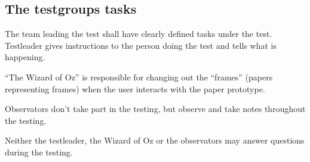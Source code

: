 \subsection{The testgroups tasks}
The team leading the test shall have clearly defined tasks under the test. Testleader gives 
instructions to the person doing the test and tells what is happening.

``The Wizard of Oz'' is responsible for changing out the ``frames'' (papers representing frames) 
when the user interacts with the paper prototype.

Observators don't take part in the testing, but observe and take notes throughout the testing.

Neither the testleader, the Wizard of Oz or the observators may answer questions during the testing.
